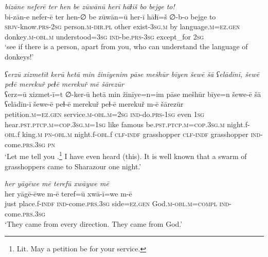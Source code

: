 \ea \label{HB.91}
\textit{bizāne neferē ter hen be zūwānū herī hāɫīš bo bejge to!} \\ 
\gll bi-zān-e nefer-ē ter hen-∅ be zūwān=ū her-ī hāɫī=š ∅-b-o bejge to \\ 
 \textsc{sbjv-}know\textsc{.prs}-\textsc{2sg} person\textsc{.m}\textsc{-dir}\textsc{.pl} other exist\textsc{-3sg}\textsc{.m} by language\textsc{.m}\textsc{=ez}\textsc{.gen} donkey\textsc{.m}\textsc{-obl}\textsc{.m} understood\textsc{=3sg} \textsc{ind-}be\textsc{.prs}\textsc{-3sg} except\_for \textsc{2sg} \\ 
\glt `see if there is a person, apart from you, who can understand the language of donkeys!'
\z 
 
\ea \label{PM.1}
\textit{ʕerzū xizmetīt kerū hetā min žinīyenim pāse mešhūr bīyen šewē šā ʕelādīnī, šewē peɫē merekuř peɫē merekuř mē šārezūr} \\ 
\gll ʕerz=ū xizmet-ī=t ∅-ker-ū hetā min žinīye=n=im pāse mešhūr bīye=n šewe-ē šā ʕelādīn-ī šewe-ē peɫ-ē merekuř peɫ-ē merekuř m-ē šārezūr \\ 
 petition\textsc{.m}\textsc{\textsc{=ez.gen}} service\textsc{.m}\textsc{-obl}\textsc{.m}\textsc{=\textsc{2sg}} \textsc{ind-}do\textsc{.prs}\textsc{-\textsc{1sg}} even \textsc{1sg} hear\textsc{.pst}\textsc{.ptcp}\textsc{.m}\textsc{=cop}\textsc{.3sg}\textsc{.m}\textsc{=\textsc{1sg}} like famous be\textsc{.pst}\textsc{.ptcp}\textsc{.m}\textsc{=cop}\textsc{.3sg}\textsc{.m} night.f\textsc{-obl}.f king\textsc{.m} \textsc{pn}\textsc{-obl}\textsc{.m} night.f\textsc{-obl}.f \textsc{clf}\textsc{-indf} grasshopper \textsc{clf}\textsc{-indf} grasshopper \textsc{ind-}come\textsc{.prs}\textsc{.3sg} \textsc{pn} \\ 
\glt `Let me tell you .\footnote{Lit. May a petition be for your service.} I have even heard (this). It is well known that a swarm of grasshoppers came to Sharazour one night.'
\z 
 
\ea \label{PM.3}
\textit{her yāgēwe mē terefū xwāywe mē} \\ 
\gll her yāgē-ēwe m-ē teref=ū xwā-ī=we m-ē \\ 
 just place.f\textsc{-indf} \textsc{ind-}come\textsc{.prs}\textsc{.3sg} side\textsc{\textsc{=ez.gen}} God\textsc{.m}\textsc{-obl}\textsc{.m}\textsc{=compl} \textsc{ind-}come\textsc{.prs}\textsc{.3sg} \\ 
\glt `They came from every direction. They came from God.'
\z 
 
